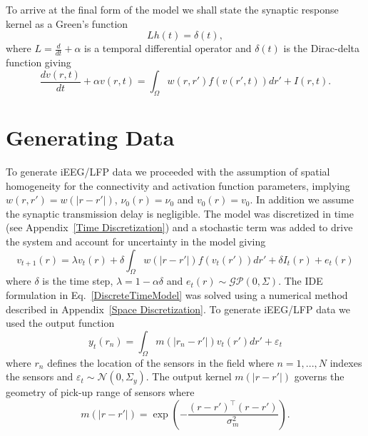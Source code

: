 \documentclass[onecolumn,draftcls]{IEEEtran}
\begin{document}
To arrive at the final form of the model we shall state the synaptic response kernel as a Green's function
\begin{equation}\label{GreensFuncDef}
	Lh\left( t \right) = \delta \left( t \right),
\end{equation}
where $L=\frac{d}{dt} + \alpha$ is a temporal differential operator and $\delta(t)$ is the Dirac-delta function giving 
\begin{equation}\label{FinalForm1}
	\frac{dv\left( r,t \right)}{dt} + \alpha v\left( r,t \right) = \int_\Omega  {w\left( r,r' \right)f\left( {v\left( r',t \right)} \right)dr'} + I\left(r,t\right).
\end{equation}

\section{Generating Data}
To generate iEEG/LFP data we proceeded with the assumption of spatial homogeneity for the connectivity and activation function parameters, implying $w(r,r') = w\left(|r-r'|\right)$, $\nu_0(r) = \nu_0$ and $v_0(r) = v_0$. In addition we assume the synaptic transmission delay is negligible. The model was discretized in time  (see Appendix~\ref{Time Discretization}) and a stochastic term was added to drive the system and account for uncertainty in the model giving
\begin{equation}\label{DiscreteTimeModel}
	v_{t+1}\left(r\right) = \lambda v_t\left(r\right) + \delta \int_\Omega { w\left(|r-r'|\right) f\left(v_t\left(r'\right)\right) dr'} + \delta I_t\left(r\right) + e_t\left(r\right)
\end{equation}
where $\delta$ is the time step, $\lambda = 1-\alpha\delta$ and $e_t(r) \sim \mathcal{GP}(0,\Sigma)$. The IDE formulation in Eq.~\ref{DiscreteTimeModel} was solved using a numerical method described in Appendix~\ref{Space Discretization}. To generate iEEG/LFP data we used the output function 
\begin{equation}
	y_t(r_n) = \int_{\Omega}{m\left(|r_n-r'|\right)v_t\left(r'\right)dr'} + \varepsilon_t
\end{equation}
where $r_n$ defines the location of the sensors in the field where $n=1,...,N$ indexes the sensors and $\varepsilon_t \sim \mathcal{N}\left(0,\Sigma_y\right)$. The output kernel $m(|r-r'|)$ governs the geometry of pick-up range of sensors where
\begin{equation}
	m\left(|r-r'|\right) = \exp{\left(-\frac{(r-r')^\top(r-r')}{\sigma_m^2}\right)}.
\end{equation}
\end{document}
